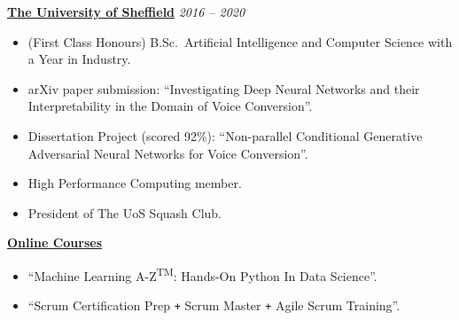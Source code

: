 \documentclass[10pt]{article} %
\begin{document}
\begin{changemargin}{0pt}{0.5pt}
\begin{minipage}[t]{0.44\textwidth}
\begin{changemargin}{5pt}{5pt}
\begin{itemize}
\end{itemize}



\vspace{5pt}
\underline{\textbf{The University of Sheffield}} \hfill \textit{ 2016 --  2020}\\
\par
\vspace{-15pt}

\begin{itemize} \itemsep-2pt %
  \item (First Class Honours) B.Sc.\ Artificial Intelligence and Computer Science with a Year in Industry.
  \item arXiv paper submission: \enquote{Investigating Deep Neural Networks and their Interpretability in the Domain of Voice Conversion}.
  \item Dissertation Project (scored 92\%): \enquote{Non-parallel Conditional Generative Adversarial Neural Networks for Voice Conversion}.
  \item High Performance Computing member.
  \item President of The UoS Squash Club.
\end{itemize}

	
\vspace{5pt}
\underline{\textbf{Online Courses}}\\
\par
\vspace{-15pt}

\begin{itemize} \itemsep-2pt %
	\item \enquote{Machine Learning A-Z\textsuperscript{TM}: Hands-On Python In Data Science}.
	\item \enquote{Scrum Certification Prep \texttt{+} Scrum Master \texttt{+} Agile Scrum Training}.
\end{itemize}
	

\end{changemargin}
\end{minipage}
\end{changemargin}
\end{document}
